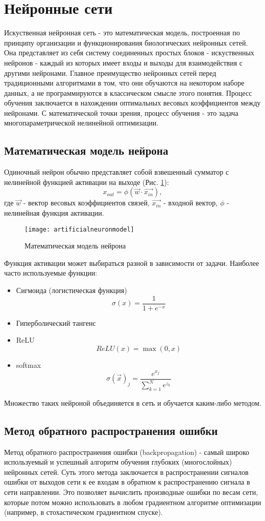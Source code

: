 \section{Нейронные сети}
	Искуственная нейронная сеть - это математическая модель, построенная по принципу организации и функционирования биологических нейронных сетей. Она представляет из себя систему соединенных простых блоков - искуственных нейронов - каждый из которых имеет входы и выходы для взаимодействия с другими нейронами. Главное преимущество нейронных сетей перед традиционными алгоритмами в том, что они обучаются на некотором наборе данных, а не программируются в классическом смысле этого понятия. Процесс обучения заключается в нахождении оптимальных весовых коэффициентов между нейронами. С математической точки зрения, процесс обучения - это задача многопараметрической нелинейной оптимизации.
	\subsection{Математическая модель нейрона}
		Одиночный нейрон обычно представляет собой взвешенный сумматор с нелинейной функцией активации на выходе (Рис. \ref{artificial-neuron-model}):
		$$x_{out} = \phi(\vec{w} \cdotp \vec{x_{in}}),$$
		где $\vec{w}$ - вектор весовых коэффициентов связей, $\vec{x_{in}}$ - входной вектор, $\phi$ - нелинейная функция активации.
		\begin{figure}[h]
			\begin{center}
				\texttt{[image: artificialneuronmodel]}
			\end{center}
			\caption{Математическая модель нейрона}
			\label{artificial-neuron-model}
		\end{figure}
		
		Функция активации может выбираться разной в зависимости от задачи. Наиболее часто используемые функции:
		\begin{itemize}
			\item Сигмоида (логистическая функция)
					$$\sigma(x) = \frac{1}{1 + e^{-x}}$$
			\item Гиперболический тангенс
			\item ReLU
					$$ReLU(x) = \max(0, x)$$
			\item softmax
					$$\sigma(\vec{x})_j = \frac{e^{x_j}}{\sum_{k=1}^{N} e^{z_k}}$$
		\end{itemize}
		Множество таких нейроной объединяется в сеть и обучается каким-либо методом.
	\subsection{Метод обратного распространения ошибки}
		Метод обратного распространения ошибки (backpropagation) - самый широко используемый и успешный алгоритм обучения глубоких (многослойных) нейронных сетей. Суть этого метода заключается в распространении сигналов ошибки от выходов сети к ее входам в обратном к распространению сигнала в сети направлении. Это позволяет вычислить производные ошибки по весам сети, которые потом можно использовать в любом градиентном алгоритме оптимизации (например, в стохастическом градиентном спуске).
		
